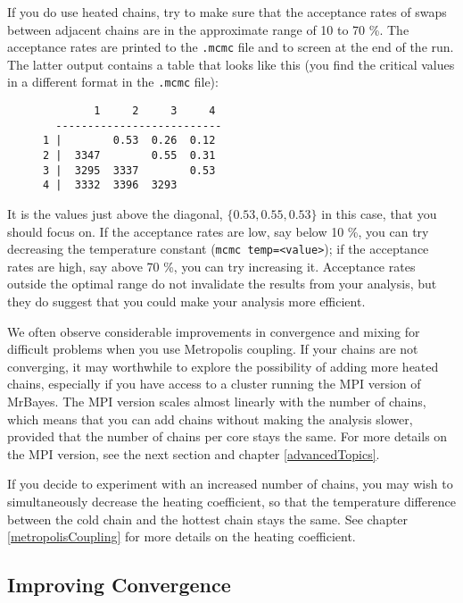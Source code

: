 \documentclass[12pt]{book}
\begin{document}
If you do use heated chains, try to make sure that the acceptance rates of swaps between adjacent
chains are in the approximate range of 10 to 70 \%. The acceptance rates are printed to the
\texttt{.mcmc} file and to screen at the end of the run. The latter output contains a table that
looks like this (you find the critical values in a different format in the \texttt{.mcmc} file):

\begin{figure}[h]
\centering
\begin{BVerbatim}
        1     2     3     4 
  --------------------------
1 |        0.53  0.26  0.12 
2 |  3347        0.55  0.31 
3 |  3295  3337        0.53 
4 |  3332  3396  3293       
\end{BVerbatim}
\end{figure}

It is the values just above the diagonal, $\{0.53, 0.55, 0.53\}$ in this case, that you should
focus on. If the acceptance rates are low, say below 10 \%, you can try decreasing the temperature
constant (\texttt{mcmc temp=<value>}); if the acceptance rates are high, say above 70 \%, you can
try increasing it. Acceptance rates outside the optimal range do not invalidate the results from
your analysis, but they do suggest that you could make your analysis more efficient.

We often observe considerable improvements in convergence and mixing for difficult problems when
you use Metropolis coupling. If your chains are not converging, it may worthwhile to explore the
possibility of adding more heated chains, especially if you have access to a cluster running the
MPI version of MrBayes. The MPI version scales almost linearly with the number of chains, which
means that you can add chains without making the analysis slower, provided that the number of
chains per core stays the same. For more details on the MPI version, see the next section and
chapter \ref{advancedTopics}.

If you decide to experiment with an increased number of chains, you may wish to simultaneously
decrease the heating coefficient, so that the temperature difference between the cold chain and the
hottest chain stays the same. See chapter \ref{metropolisCoupling} for more details on the heating
coefficient.

\subsection{Improving Convergence}
\end{document}
